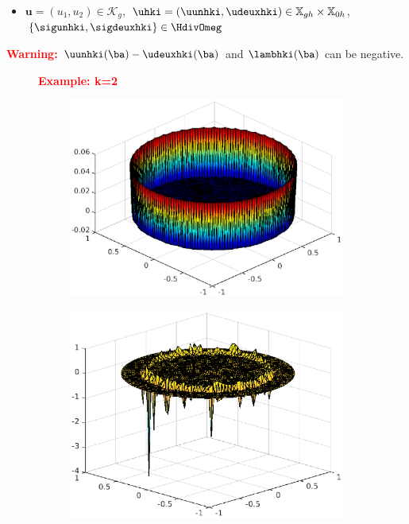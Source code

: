 \documentclass[10 pt]{beamer}
\begin{document}
\begin{frame}
\begin{itemize}
\item
${\bm u}=(u_1,u_2)\in\mathcal{K}_g$,\ $\uhki=(\uunhki,\udeuxhki)\in \mathbb{X}_{gh} \times \mathbb{X}_{0h}$,\ $\left\{\sigunhki, \sigdeuxhki\right\} \in \HdivOmeg$
\end{itemize}
\textcolor{red}{\textbf{Warning:}}
$\uunhki(\ba) - \udeuxhki(\ba)$ and $\lambhki(\ba)$ can be negative. 
\begin{figure}[H]
\textcolor{red}{\hspace{-1.4 cm} \textbf{Example: k=2}}
\begin{subfigure}[normal]{0.35\textwidth} 
\includegraphics[width=\textwidth]{fig_article/diff_u1_u2_newton_gmres.eps}    
\label{ref:position_membrane_inside_iter}
\end{subfigure}
\begin{subfigure}[normal]{0.35\textwidth}
\includegraphics[width=\textwidth]{fig_article/lambda_newton_iter7.eps}     

\end{subfigure}
\end{figure}
\end{frame}
\end{document}

